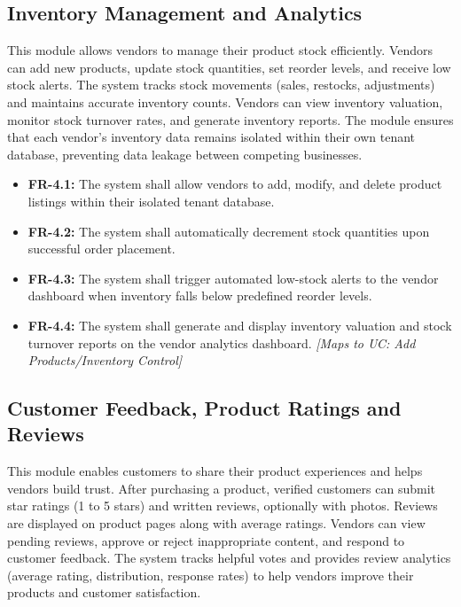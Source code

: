 \subsection{Inventory Management and Analytics}
This module allows vendors to manage their product stock efficiently. Vendors can add new products, update stock quantities, set reorder levels, and receive low stock alerts. The system tracks stock movements (sales, restocks, adjustments) and maintains accurate inventory counts. Vendors can view inventory valuation, monitor stock turnover rates, and generate inventory reports. The module ensures that each vendor's inventory data remains isolated within their own tenant database, preventing data leakage between competing businesses.

\begin{itemize}
    \item \textbf{FR-4.1:} The system shall allow vendors to add, modify, and delete product listings within their isolated tenant database.
    \item \textbf{FR-4.2:} The system shall automatically decrement stock quantities upon successful order placement.
    \item \textbf{FR-4.3:} The system shall trigger automated low-stock alerts to the vendor dashboard when inventory falls below predefined reorder levels.
    \item \textbf{FR-4.4:} The system shall generate and display inventory valuation and stock turnover reports on the vendor analytics dashboard. \textit{[Maps to UC: Add Products/Inventory Control]}
\end{itemize}

\subsection{Customer Feedback, Product Ratings and Reviews}
This module enables customers to share their product experiences and helps vendors build trust. After purchasing a product, verified customers can submit star ratings (1 to 5 stars) and written reviews, optionally with photos. Reviews are displayed on product pages along with average ratings. Vendors can view pending reviews, approve or reject inappropriate content, and respond to customer feedback. The system tracks helpful votes and provides review analytics (average rating, distribution, response rates) to help vendors improve their products and customer satisfaction.


